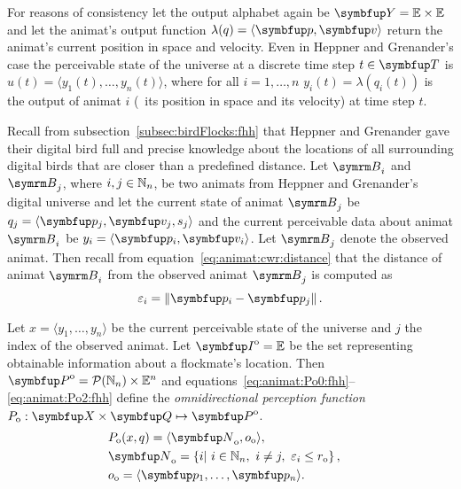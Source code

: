 For reasons of consistency let the output alphabet again be $\set{Y}=\E \times \E$ and let the animat's output function $\lambda(q)=\langle\vect{p},\vect{v}\rangle$ return the animat's current position in space and velocity. Even in Heppner and Grenander's case the perceivable state of the universe at a discrete time step $t \in \set{T}$ is $u(t)=\langle y_1(t),\ldots,y_n(t)\rangle$, where for all $i=1,\ldots,n$ $y_i(t)=\lambda(q_i(t))$ is the output of animat $i$ (\ie\ its position in space and its velocity) at time step $t$. 

Recall from subsection~\ref{subsec:birdFlocks:fhh} that Heppner and Grenander gave their digital bird full and precise knowledge about the locations of all surrounding digital birds that are closer than a predefined distance. Let $\autom{B}_i$ and $\autom{B}_j$, where $i, j \in \mathbb{N}_n$, be two animats from Heppner and Grenander's digital universe and let the current state of animat $\autom{B}_j$ be $q_j=\langle \vect{p}_j,\vect{v}_j,s_j \rangle$ and the current perceivable data about animat $\autom{B}_i$ be $y_i=\langle \vect{p}_i, \vect{v}_i \rangle$. Let $\autom{B}_j$ denote the observed animat. Then recall from equation~\eqref{eq:animat:cwr:distance} that the distance of animat $\autom{B}_i$ from the observed animat $\autom{B}_j$ is computed as
%
\begin{equation}
	\varepsilon_i=\left\|\vect{p}_i - \vect{p}_j\right\|. \nonumber
\end{equation}

\begin{definition}
	\label{def:animat:Po:fhh}
	Let $x=\langle y_1,\ldots,y_n\rangle$ be the current perceivable state of the universe and $j$ the index of the observed animat. Let $\set{I}^\textnormal{o}=\E$ be the set representing obtainable information about a flockmate's location. Then $\set{P}^\textnormal{o}=\powset{\N_n} \times \E^n$ and equations~\eqref{eq:animat:Po0:fhh}--\eqref{eq:animat:Po2:fhh} define the \emph{omnidirectional perception function} $P_\textnormal{o}: \set{X} \times \set{Q} \mapsto \set{P}^\textnormal{o}$.
	\begin{eqnarray}
		& P_\textnormal{o}(x,q)=\langle\set{N}_\textnormal{o},o_\textnormal{o}\rangle, & \label{eq:animat:Po0:fhh} \\
		& \set{N}_\textnormal{o}=\left\{i|\ i \in \N_n,\ i \neq j,\ \varepsilon_i \leq r_\textnormal{o} \right\}, & \\ 
		& o_\textnormal{o}=\langle \vect{p}_1,\ldots,\vect{p}_n\rangle. & \label{eq:animat:Po2:fhh}
	\end{eqnarray}
\end{definition}

